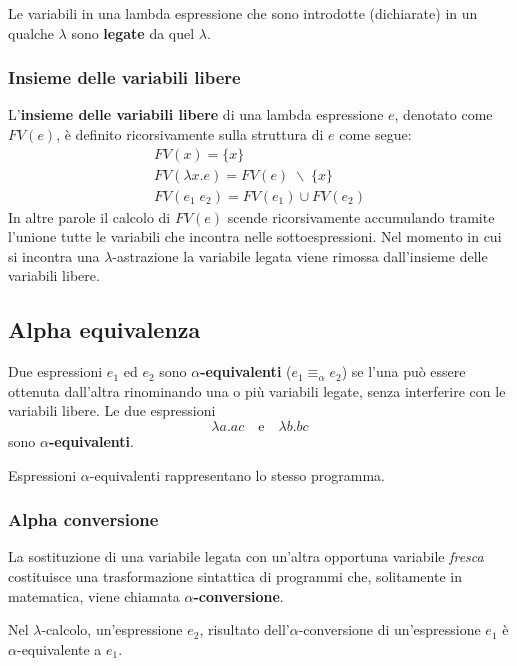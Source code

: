 Le variabili in una lambda espressione che sono introdotte (dichiarate) in un qualche $\lambda$ sono
\textbf{legate} da quel $\lambda$.

\subsubsection{Insieme delle variabili libere}
L'\textbf{insieme delle variabili libere} di una lambda espressione $e$, denotato come $FV(e)$, è definito
ricorsivamente sulla struttura di $e$ come segue:
\begin{gather*}
	FV(x) = \{ x \} \\
	FV(\lambda x.e) = FV(e) \; \backslash \; \{ x \} \\
	FV(e_1 \; e_2) = FV(e_1) \cup FV(e_2)
\end{gather*}
In altre parole il calcolo di $FV(e)$ scende ricorsivamente accumulando tramite l'unione tutte le variabili che
incontra nelle sottoespressioni. Nel momento in cui si incontra una $\lambda$-astrazione la variabile legata
viene rimossa dall'insieme delle variabili libere.

\subsection{Alpha equivalenza}
Due espressioni $e_1$ ed $e_2$ sono \textbf{$\alpha$-equivalenti} ($e_1 \equiv_\alpha e_2$) se l'una può essere
ottenuta dall'altra rinominando una o più variabili legate, senza interferire con le variabili libere. Le due
espressioni
\[ \lambda a.ac \quad \text{e} \quad \lambda b.bc \]
sono \textbf{$\alpha$-equivalenti}.

Espressioni $\alpha$-equivalenti rappresentano lo stesso programma.

\subsubsection{Alpha conversione}
La sostituzione di una variabile legata con un'altra opportuna variabile \emph{fresca} costituisce una
trasformazione sintattica di programmi che, solitamente in matematica, viene chiamata \textbf{$\alpha$-conversione}.

Nel $\lambda$-calcolo, un'espressione $e_2$, risultato dell'$\alpha$-conversione di un'espressione $e_1$ è
$\alpha$-equivalente a $e_1$.